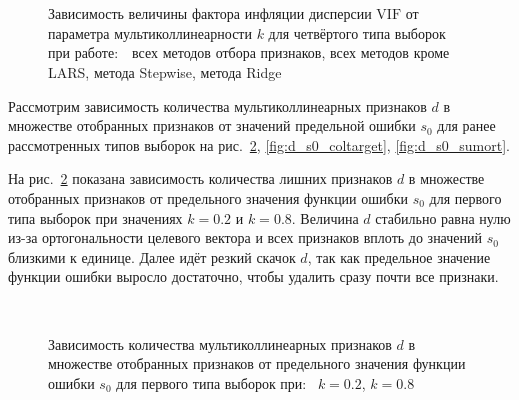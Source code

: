 \documentclass[a4paper,12pt]{article}
\newcommand{\vif}{\mathrm{VIF}}
\begin{document}
\begin{figure}[!h]
\centering
{}
~
\\
~
\caption{Зависимость величины фактора инфляции дисперсии $\vif$ от параметра мультиколлинеарности $k$ для четвёртого типа выборок при работе:~~всех методов отбора признаков,  всех методов кроме LARS,  метода Stepwise,  метода Ridge }
\label{fig:Vif_k_sumort}
\end{figure} 

Рассмотрим зависимость количества мультиколлинеарных признаков $d$ в множестве отобранных признаков от значений предельной ошибки $s_0$ для ранее рассмотренных типов выборок на рис.~\ref{fig:d_s0_ortcol}, \ref{fig:d_s0_coltarget}, \ref{fig:d_s0_sumort}. 

На рис.~\ref{fig:d_s0_ortcol} показана зависимость количества лишних признаков $d$ в множестве отобранных признаков от предельного значения функции ошибки $s_0$ для первого типа выборок при значениях $k = 0.2$ и $k = 0.8$. Величина $d$ стабильно равна нулю из-за ортогональности целевого вектора и всех признаков вплоть до значений $s_0$ близкими к единице. Далее идёт резкий скачок $d$, так как предельное значение функции ошибки выросло достаточно, чтобы удалить сразу почти все признаки.  

\begin{figure}[!h]
\centering
{}
~
\caption{Зависимость количества мультиколлинеарных признаков $d$ в множестве отобранных признаков от предельного значения функции ошибки $s_0$ для первого типа выборок при:~ $k = 0.2$,  $k = 0.8$}
\label{fig:d_s0_ortcol}
\end{figure}
\end{document}
